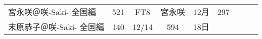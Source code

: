 \documentclass[UTF8, punct=kaiming, zihao=-4]{ctexbook}
\begin{document}
{\begin{longtable}{lrccccccc}
\multicolumn{1}{|l|}{宮永咲＠咲-Saki- 全国編}                    & \multicolumn{1}{r|}{521} & \multicolumn{1}{c|}{FT8}    & \multicolumn{1}{c|}{宮永咲}   & \multicolumn{1}{c|}{12月} & \multicolumn{1}{c|}{297}   & \multicolumn{1}{c|}{}       & \multicolumn{1}{c|}{}    & \multicolumn{1}{c|}{}       \\ \cline{1-2}
\multicolumn{1}{|l|}{末原恭子＠咲-Saki- 全国編}                   & \multicolumn{1}{r|}{140} & \multicolumn{1}{c|}{12/14} & \multicolumn{1}{c|}{594}   & \multicolumn{1}{c|}{18日}       & \multicolumn{1}{c|}{}      & \multicolumn{1}{c|}{}       & \multicolumn{1}{c|}{}    & \multicolumn{1}{c|}{}       \\ \hline
\end{longtable}
}
\end{document}
